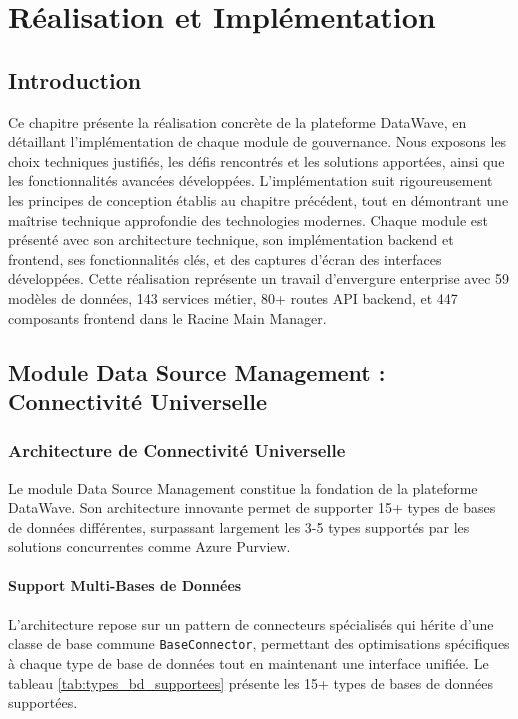 \chapter{Réalisation et Implémentation}

\section*{Introduction}

Ce chapitre présente la réalisation concrète de la plateforme DataWave, en détaillant l'implémentation de chaque module de gouvernance. Nous exposons les choix techniques justifiés, les défis rencontrés et les solutions apportées, ainsi que les fonctionnalités avancées développées. L'implémentation suit rigoureusement les principes de conception établis au chapitre précédent, tout en démontrant une maîtrise technique approfondie des technologies modernes. Chaque module est présenté avec son architecture technique, son implémentation backend et frontend, ses fonctionnalités clés, et des captures d'écran des interfaces développées. Cette réalisation représente un travail d'envergure enterprise avec 59 modèles de données, 143 services métier, 80+ routes API backend, et 447 composants frontend dans le Racine Main Manager.

\section{Module Data Source Management : Connectivité Universelle}

\subsection{Architecture de Connectivité Universelle}

Le module Data Source Management constitue la fondation de la plateforme DataWave. Son architecture innovante permet de supporter 15+ types de bases de données différentes, surpassant largement les 3-5 types supportés par les solutions concurrentes comme Azure Purview.

\subsubsection{Support Multi-Bases de Données}

L'architecture repose sur un pattern de connecteurs spécialisés qui hérite d'une classe de base commune \texttt{BaseConnector}, permettant des optimisations spécifiques à chaque type de base de données tout en maintenant une interface unifiée. Le tableau \ref{tab:types_bd_supportees} présente les 15+ types de bases de données supportées.

